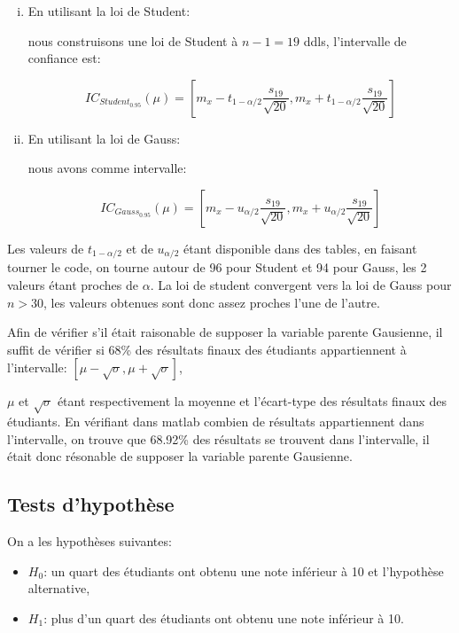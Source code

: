 \documentclass[11pt]{report}
\begin{document}
\begin{enumerate}[(a)]
\begin{enumerate}[(i)]

\item En utilisant la loi de Student: 

nous construisons une loi de Student à $n-1=19$ ddls, l'intervalle de confiance est:

\[ IC_{Student_{0.95}}(\mu) = \left[m_x - t_{1-\alpha/2}\frac{s_{19}}{\sqrt{20}}, m_x + t_{1-\alpha/2}\frac{s_{19}}{\sqrt{20}}\right] \]

\item En utilisant la loi de Gauss: 

nous avons comme intervalle:

\[ IC_{Gauss_{0.95}}(\mu) = \left[m_x - u_{\alpha/2}\frac{s_{19}}{\sqrt{20}}, m_x + u_{\alpha/2}\frac{s_{19}}{\sqrt{20}}\right] \]

\end{enumerate}

Les valeurs de $t_{1-\alpha/2}$ et de $u_{\alpha/2}$ étant disponible dans des tables, en faisant tourner le code, on tourne autour de 96 pour Student et 94 pour Gauss, les 2 valeurs étant proches de $\alpha$. La loi de student convergent vers la loi de Gauss pour $n > 30$, les valeurs obtenues sont donc assez proches l'une de l'autre.

Afin de vérifier s'il était raisonable de supposer la variable parente Gausienne, il suffit de vérifier si 68\% des résultats finaux des étudiants appartiennent à l'intervalle: $ \left[ \mu - \sqrt{\sigma} , \mu + \sqrt{\sigma} \right] $,

$\mu $ et $\sqrt{\sigma}$ étant respectivement la moyenne et l'écart-type des résultats finaux des étudiants. En vérifiant dans matlab combien de résultats appartiennent dans l'intervalle, on trouve que 68.92\% des résultats se trouvent dans l'intervalle, il était donc résonable de supposer la variable parente Gausienne.



\end{enumerate}

\subsection*{Tests d'hypothèse}

On a les hypothèses suivantes:

\begin{itemize}

\item $H_0$: un quart des étudiants ont obtenu une note inférieur à 10 et l'hypothèse alternative,

\item $H_1$: plus d'un quart des étudiants ont obtenu une note inférieur à 10.

\end{itemize}
\end{document}
